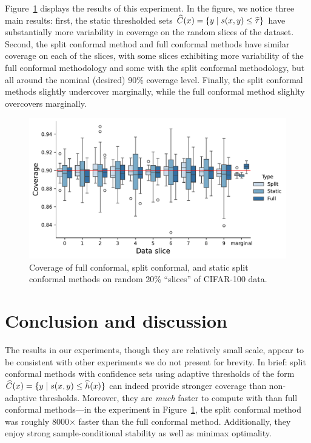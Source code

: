\documentclass[11pt]{article}
\newcommand{\scorefunc}{s}
\newcommand{\scoreval}{\scorefunc}
\begin{document}
Figure~\ref{fig:random-directions} displays the results of this experiment.
%
In the figure, we notice three main results: first, the static thresholded
sets $\what{C}(x) = \{y \mid \scoreval(x, y) \le \what{\tau}\}$ have
substantially more variability in coverage on the random slices of the
dataset.
%
Second, the split conformal method and full conformal methods have
similar coverage on each of the slices, with some
slices exhibiting more variability of the full conformal methodology
and some with the split conformal methodology, but all
around the nominal (desired) 90\% coverage level.
%
Finally, the split conformal methods slightly undercover marginally,
while the full conformal method slighlty overcovers marginally.


\begin{figure}
  \begin{center}
    \includegraphics[width=.8\columnwidth]{Images/random_directions_experiment}
    \caption{\label{fig:random-directions} Coverage of full conformal, split
      conformal, and static split conformal methods on random 20\%
      ``slices'' of CIFAR-100 data.}
  \end{center}
\end{figure}

\section{Conclusion and discussion}

The results in our experiments, though they are relatively small scale,
appear to be consistent with other experiments we do not present for
brevity.
%
In brief: split conformal methods with confidence sets using adaptive
thresholds of the form $\what{C}(x) = \{y \mid \scoreval(x, y) \le
\what{h}(x)\}$ can indeed provide stronger coverage than non-adaptive
thresholds.
%
Moreover, they are \emph{much} faster to compute with than full conformal
methods---in the experiment in Figure~\ref{fig:random-directions},
the split conformal method was roughly 8000$\times$ faster than
the full conformal method.
%
Additionally, they enjoy strong sample-conditional stability
as well as minimax optimality.
\end{document}
